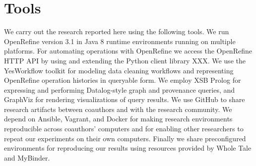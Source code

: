\section{Tools}

We carry out the research reported here using the following tools. We run OpenRefine version 3.1 in Java 8 runtime environments running on multiple platforms. For automating operations with OpenRefine we access the OpenRefine HTTP API by using and extending the Python client library XXX.  We use the YesWorkflow toolkit for modeling data cleaning workflows and representing OpenRefine operation histories in queryable form. We employ XSB Prolog for expressing and performing Datalog-style graph and provenance queries, and GraphViz for rendering visualizations of query results. We use GitHub to share research artifacts between coauthors and with the research community. We depend on Ansible, Vagrant, and Docker for making research environments reproducible across coauthors' computers and for enabling other researchers to repeat our experiments on their own computers. Finally we share preconfigured environments for reproducing our results using resources provided by Whole Tale and MyBinder.

